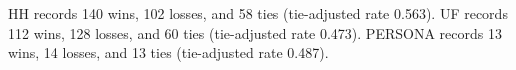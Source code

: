 HH records 140 wins, 102 losses, and 58 ties (tie-adjusted rate 0.563). UF records 112 wins, 128 losses, and 60 ties (tie-adjusted rate 0.473). PERSONA records 13 wins, 14 losses, and 13 ties (tie-adjusted rate 0.487).
